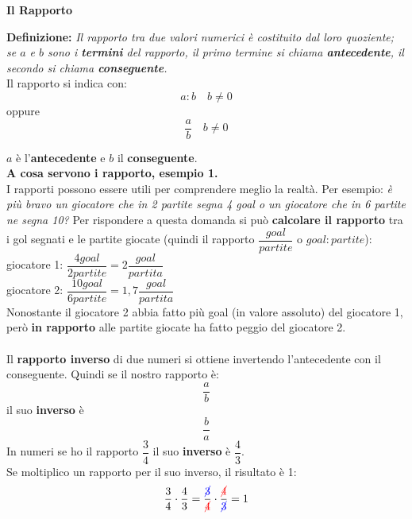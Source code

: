 \documentclass[14pt]{extarticle}
\begin{document}
\begin{center}
    \LARGE{\textbf{Il Rapporto}}
\end{center}
\vspace{1cm}
\textbf{Definizione:} \textit{Il rapporto tra due valori numerici è costituito dal loro quoziente; se \(a\) e \(b\) sono i \textbf{termini} del rapporto, il primo termine si chiama \textbf{antecedente}, il secondo si chiama \textbf{conseguente}.}\\


Il rapporto si indica con:
\[a:b \quad b\neq0\]
oppure
\[\dfrac{a}{b} \quad b\neq0\]

\(a\) è l'\textbf{antecedente} e \(b\) il \textbf{conseguente}.\\

\textbf{A cosa servono i rapporto, esempio 1.}\\
I rapporti possono essere utili per comprendere meglio la realtà. Per esempio: \textit{è più bravo un giocatore che in 2 partite segna 4 goal o un giocatore che in 6 partite ne segna 10?} Per rispondere a questa domanda si può \textbf{calcolare il rapporto} tra i gol segnati e le partite giocate (quindi il rapporto \(\dfrac{goal}{partite}\) o \(goal:partite\)):\\
giocatore 1: \(\dfrac{4goal}{2partite}=2\dfrac{goal}{partita}\)\\

giocatore 2: \(\dfrac{10goal}{6partite}=1,7\dfrac{goal}{partita}\)\\

Nonostante il giocatore 2 abbia fatto più goal (in valore assoluto) del giocatore 1, però \textbf{in rapporto} alle partite giocate ha fatto peggio del giocatore 2.\\

\\

Il \textbf{rapporto inverso} di due numeri si ottiene invertendo l'antecedente con il conseguente. Quindi se il nostro rapporto è:
\[\dfrac{a}{b}\]
il suo \textbf{inverso} è
\[\dfrac{b}{a}\]
In numeri se ho il rapporto \(\dfrac{3}{4}\) il suo \textbf{inverso} è \(\dfrac{4}{3}\).\\
Se moltiplico un rapporto per il suo inverso, il risultato è 1:
\[\dfrac{3}{4}\cdot\dfrac{4}{3}=\dfrac{\textcolor{blue}{\cancel3}}{\textcolor{red}{\cancel4}}\cdot\dfrac{\textcolor{red}{\cancel4}}{\textcolor{blue}{\cancel3}}=1\]
\end{document}
